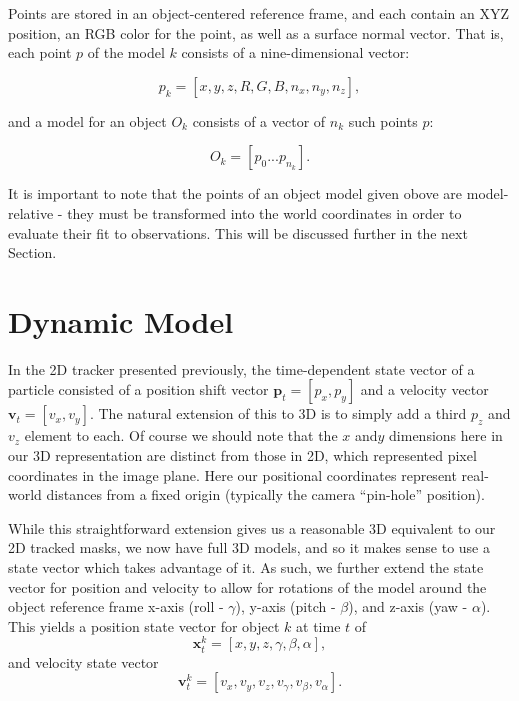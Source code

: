 
Points are stored in an object-centered reference frame, and each contain an XYZ position, an RGB color for the point, as well as a surface normal vector. That is, each point $p$ of the model $k$ consists of a nine-dimensional vector: 

\begin{equation} \label{eqn:point}
p_k = [x,y,z,R,G,B,n_x,n_y,n_z],
\end{equation}
 
 and a model for an object $O_k$ consists of a vector of $n_k$ such points $p$:
 
 \begin{equation} \label{eqn:model}
 O_k = [p_0 ... p_{n_k}].
\end{equation}

It is important to note that the points of an object model given obove are model-relative - they must be transformed into the world coordinates in order to evaluate their fit to observations. This will be discussed further in the next Section.

\section{Dynamic Model}
\label{sec:Dynamic_model}
In the 2D tracker presented previously, the time-dependent state vector of a particle consisted of a position shift vector $\mathbf{p}_t=[p_x,p_y]$ and a velocity vector $\mathbf{v}_t=[v_x,v_y]$. The natural extension of this to 3D is to simply add a third $p_z$ and $v_z$ element to each. Of course we should note that the $x$ and$y$ dimensions here in our 3D representation are distinct from those in 2D, which represented pixel coordinates in the image plane. Here our positional coordinates represent real-world distances from a fixed origin (typically the camera ``pin-hole'' position).

While this straightforward extension gives us a reasonable 3D equivalent to our 2D tracked masks, we now have full 3D models, and so it makes sense to use a state vector which takes advantage of it. As such, we further extend the state vector for position and velocity to allow for rotations of the model around the object reference frame x-axis (roll - $\gamma$), y-axis (pitch - $\beta$), and z-axis (yaw - $\alpha$). This yields a position state vector for object $k$ at time $t$ of 
\begin{equation} 
 \mathbf{x}^k_t = [x, y, z, \gamma, \beta, \alpha],
\end{equation}
 and velocity state vector 
\begin{equation} 
 \mathbf{v}^k_t = [v_x, v_y, v_z, v_{\gamma}, v_{\beta}, v_{\alpha}].
\end{equation}
 
